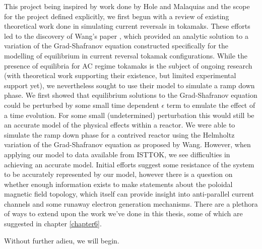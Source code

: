 This project being inspired by work done by Hole and Malaquias and the scope for the project defined explicitly, 
we first begun with a review of existing theoretical work done in simulating current reversals in tokamaks. These 
efforts led to the discovery of Wang's paper \cite{wang-analytic-solution}, which provided an analytic solution 
to a variation of the Grad-Shafranov equation constructed specifically for the modelling of equilibrium in 
current reversal tokamak configurations. While the presence of equilibria for AC regime tokamaks is the subject of 
ongoing research (with theoretical work supporting their existence, but limited experimental support yet), 
we nevertheless sought to use their model to simulate a ramp down phase. We first showed that equilibrium 
solutions to the Grad-Shafranov equation could be perturbed by some small time dependent $\epsilon$ term to 
emulate the effect of a time evolution. For some small (undetermined) perturbation this would still be an accurate 
model of the physical effects within a reactor. We were able to simulate the ramp down phase for a contrived reactor using 
the Helmholtz variation of the Grad-Shafranov equation as proposed by Wang. However, when applying our model to 
data available from ISTTOK, we see difficulties in achieving an accurate model. Initial efforts suggest some resistance 
of the system to be accurately represented by our model, however there is a question on whether enough 
information exists to make statements about the poloidal magnetic field topology, which itself can provide 
insight into anti-parallel current channels and some runaway electron generation mechanisms. There are a 
plethora of ways to extend upon the work we've done in this thesis, some of which are suggested in chapter \ref{chapter6}.

Without further adieu, we will begin.
